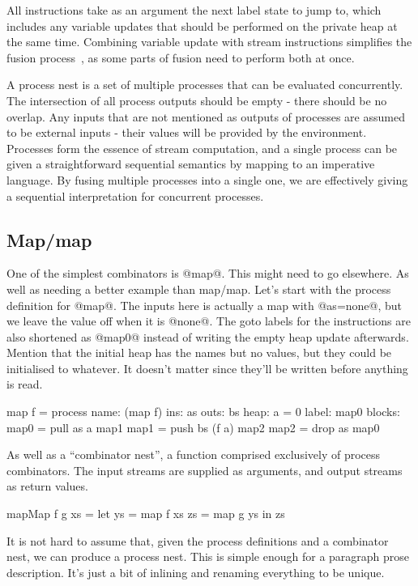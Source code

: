 All instructions take as an argument the next label state to jump to, which includes any variable updates that should be performed on the private heap at the same time.
Combining variable update with stream instructions simplifies the fusion process~\REF, as some parts of fusion need to perform both at once.


A process nest is a set of multiple processes that can be evaluated concurrently.
The intersection of all process outputs should be empty - there should be no overlap.
Any inputs that are not mentioned as outputs of processes are assumed to be external inputs - their values will be provided by the environment.
Processes form the essence of stream computation, and a single process can be given a straightforward sequential semantics by mapping to an imperative language.
By fusing multiple processes into a single one, we are effectively giving a sequential interpretation for concurrent processes.


\subsection{Map/map}
\label{s:Process:MapMap}

One of the simplest combinators is @map@.
This might need to go elsewhere.
As well as needing a better example than map/map.
Let's start with the process definition for @map@.
The inputs here is actually a map with @as=none@, but we leave the value off when it is @none@.
The goto labels for the instructions are also shortened as @map0@ instead of writing the empty heap update afterwards.
Mention that the initial heap has the names but no values, but they could be initialised to whatever.
It doesn't matter since they'll be written before anything is read.

\begin{code}
map f = process
    name: (map f)
     ins: as
    outs: bs
    heap: {a = 0}
   label: map0
  blocks: map0 = pull as    a  map1
          map1 = push bs (f a) map2
          map2 = drop as       map0
\end{code}

As well as a ``combinator nest'', a function comprised exclusively of process combinators.
The input streams are supplied as arguments, and output streams as return values.
\begin{code}
mapMap f g xs
 = let ys = map f xs
       zs = map g ys
   in  zs
\end{code}

It is not hard to assume that, given the process definitions and a combinator nest, we can produce a process nest.
This is simple enough for a paragraph prose description.
It's just a bit of inlining and renaming everything to be unique.

